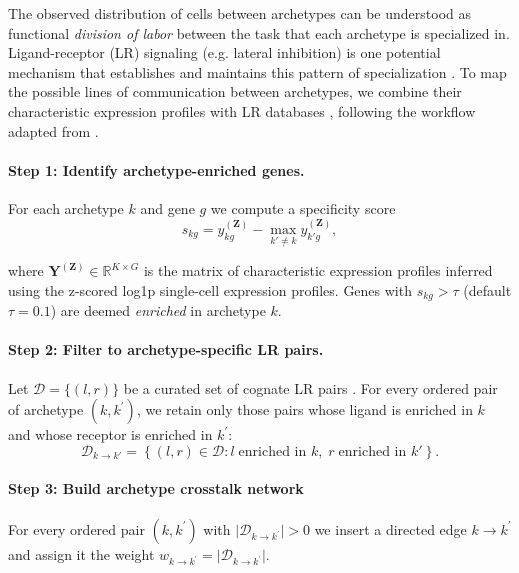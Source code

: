 \documentclass[oneside]{article}
\begin{document}
The observed distribution of cells between archetypes can be understood as functional \emph{division of labor} between the task that each archetype is specialized in. Ligand-receptor (LR) signaling (e.g. lateral inhibition) is one potential mechanism that establishes and maintains this pattern of specialization \autocite{adlerDivisionOfLabor2023}. To map the possible lines of communication between archetypes, we combine their characteristic expression profiles with LR databases \autocite{liana2022,lianaPlus2024}, following the workflow adapted from \textcite{adlerDivisionOfLabor2023}.

\paragraph{Step 1: Identify archetype-enriched genes.}
For each archetype $k$ and gene $g$ we compute a specificity score\begin{equation}
    s_{kg}=y^{(\mathbf{Z})}_{kg}-\max_{k'\neq k}y^{(\mathbf{Z})}_{k'g},
\end{equation}

where $\mathbf{Y}^{(\mathbf{Z})}\in\mathbb{R}^{K\times G}$ is the matrix of characteristic expression profiles inferred using the z-scored log1p single-cell expression profiles. Genes with $s_{kg}>\tau$ (default $\tau=0.1$) are deemed \emph{enriched} in archetype $k$.

\paragraph{Step 2: Filter to archetype-specific LR pairs.}
Let $\mathcal{D}=\{(l,r)\}$ be a curated set of cognate LR pairs \autocite{liana2022,lianaPlus2024}. For every ordered pair of archetype $(k, k^\prime)$, we retain only those pairs whose ligand is enriched in $k$ and whose receptor is enriched in $k^\prime$:\begin{equation}
    \mathcal{D}_{k\to k'}=\left\{(l,r)\in\mathcal{D}:
    l\;\text{enriched in }k,\; r\;\text{enriched in }k'\right\}.
\end{equation}

\paragraph{Step 3: Build archetype crosstalk network}
For every ordered pair $(k,k^\prime)$ with $\lvert \mathcal{D}_{k\to k^\prime} \rvert>0$ we insert a directed edge $k \to k^\prime$ and assign it the weight $w_{k\to k^\prime}=\lvert \mathcal{D}_{k \to k^\prime} \rvert$.
\end{document}
